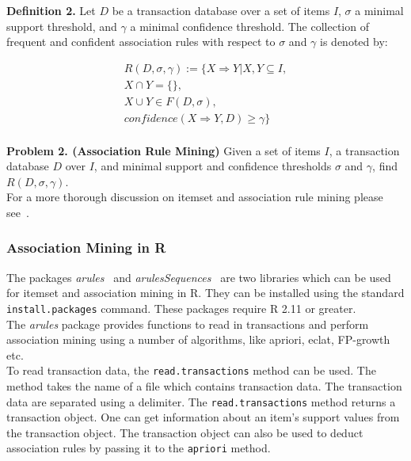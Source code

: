 \documentclass{article}
\begin{document}
{\bf Definition 2.} Let $D$ be a transaction database over a set of items $I$, $\sigma$ a minimal support threshold, and $\gamma$ a minimal confidence threshold. The collection of frequent and confident association rules with respect to $\sigma$ and $\gamma$ is denoted by:

\begin{align*}
R(D, \sigma, \gamma) := \{X \Rightarrow Y | X, Y \subseteq I, \\
X \cap Y = \{\}, \\X \cup Y \in F(D, \sigma),\\ confidence(X \Rightarrow Y, D) \ge \gamma\}
\end{align*}\\


{\bf Problem 2. (Association Rule Mining)} Given a set of items $I$, a transaction database $D$ over $I$, and minimal support and confidence thresholds $\sigma$ and $\gamma$, find $R(D, \sigma, \gamma)$. \\

For a more thorough discussion on itemset and association rule mining please see~\cite{report:patternmining}.\\

\subsubsection{Association Mining in R}

The packages {\sl arules}~\cite{r:arules} and {\sl arulesSequences}~\cite{r:arulesseq} are two libraries which can be used for itemset and association mining in R. They can be installed using the standard \verb=install.packages= command. These packages require R 2.11 or greater.\\

The {\sl arules} package provides functions to read in transactions
and perform association mining using a number of algorithms, like
apriori, eclat, FP-growth etc.\\

To read transaction data, the \verb=read.transactions= method can be
used. The method takes the name of a file which contains transaction
data. The transaction data are separated using a delimiter. The
\verb=read.transactions= method returns a transaction object. One can
get information about an item's support values from the transaction
object. The transaction object can also be used to deduct association
rules by passing it to the \verb=apriori= method.
\end{document}
